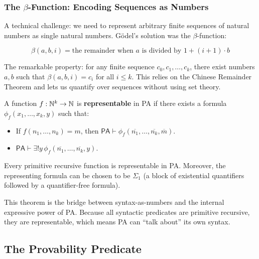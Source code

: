 \subsubsection*{The $\beta$-Function: Encoding Sequences as Numbers}

A technical challenge: we need to represent arbitrary finite sequences of natural numbers as single natural numbers. Gödel's solution was the $\beta$-function:

\begin{definition}
\[
\beta(a, b, i) = \text{the remainder when } a \text{ is divided by } 1 + (i+1) \cdot b
\]
\end{definition}

The remarkable property: for any finite sequence $c_0, c_1, \dots, c_k$, there exist numbers $a, b$ such that $\beta(a, b, i) = c_i$ for all $i \le k$. This relies on the Chinese Remainder Theorem and lets us quantify over sequences without using set theory.

\begin{definition}[Representability]
A function $f: \mathbb{N}^k \to \mathbb{N}$ is \textbf{representable} in PA if there exists a formula $\phi_f(x_1, \dots, x_k, y)$ such that:
\begin{itemize}
\item If $f(n_1, \dots, n_k) = m$, then $\mathsf{PA} \vdash \phi_f(\overline{n_1}, \dots, \overline{n_k}, \overline{m})$.
\item $\mathsf{PA} \vdash \exists! y\, \phi_f(\overline{n_1}, \dots, \overline{n_k}, y)$.
\end{itemize}
\end{definition}

\begin{theorem}
Every primitive recursive function is representable in PA. Moreover, the representing formula can be chosen to be $\Sigma_1$ (a block of existential quantifiers followed by a quantifier-free formula).
\end{theorem}

This theorem is the bridge between syntax-as-numbers and the internal expressive power of PA. Because all syntactic predicates are primitive recursive, they are representable, which means PA can ``talk about'' its own syntax.

\subsection{The Provability Predicate}
\label{sec:godel:provpred}


